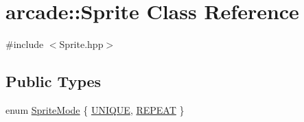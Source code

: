 \hypertarget{classarcade_1_1_sprite}{\section{arcade\-:\-:Sprite Class Reference}
\label{classarcade_1_1_sprite}
}


{\ttfamily \#include $<$Sprite.\-hpp$>$}

\subsection*{Public Types}
\begin{DoxyCompactItemize}
\item 
enum \hyperlink{classarcade_1_1_sprite_a897686598b8b81a1c7b329b5621f8146}{Sprite\-Mode} \{ \hyperlink{classarcade_1_1_sprite_a897686598b8b81a1c7b329b5621f8146a92bee83b9fb08e4a8adbc36dff64effc}{U\-N\-I\-Q\-U\-E}, 
\hyperlink{classarcade_1_1_sprite_a897686598b8b81a1c7b329b5621f8146abe65861432810d11bd4cf826b598bf1c}{R\-E\-P\-E\-A\-T}
 \}
\end{DoxyCompactItemize}
